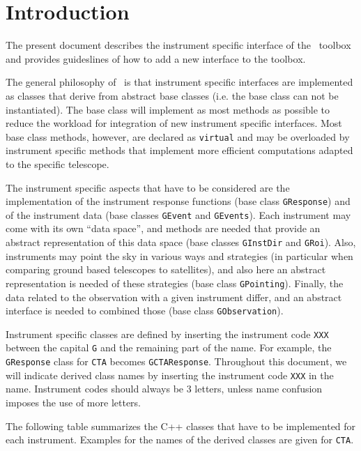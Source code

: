 \documentclass{article}[12pt,a4]
\begin{document}
\frontpage


\section{Introduction}

The present document describes the instrument specific interface of the \this\ toolbox
and provides guideslines of how to add a new interface to the toolbox.

The general philosophy of \this\ is that instrument specific interfaces are implemented
as classes that derive from abstract base classes (i.e. the base class can not be instantiated).
The base class will implement as most methods as possible to reduce the workload
for integration of new instrument specific interfaces.
Most base class methods, however, are declared as {\tt virtual} and may be overloaded by
instrument specific methods that implement more efficient computations adapted to
the specific telescope.

The instrument specific aspects that have to be considered are the implementation of
the instrument response functions (base class {\tt GResponse}) and of the instrument
data (base classes {\tt GEvent} and {\tt GEvents}).
Each instrument may come with its own ``data space'', and methods are needed
that provide an abstract representation of this data space (base classes {\tt GInstDir}
and {\tt GRoi}).
Also, instruments may point the sky in various ways and strategies (in particular when
comparing ground based telescopes to satellites), and also here an abstract representation
is needed of these strategies (base class {\tt GPointing}).
Finally, the data related to the observation with a given instrument differ, and an abstract
interface is needed to combined those (base class {\tt GObservation}).

Instrument specific classes are defined by inserting the instrument code {\tt XXX}
between the capital {\tt G} and the remaining part of the name.
For example, the {\tt GResponse} class for {\tt CTA} becomes {\tt GCTAResponse}.
Throughout this document, we will indicate derived class names by inserting the
instrument code {\tt XXX} in the name.
Instrument codes should always be 3 letters, unless name confusion imposes the
use of more letters.

The following table summarizes the C++ classes that have to be implemented for
each instrument.
Examples for the names of the derived classes are given for {\tt CTA}.
\end{document}
